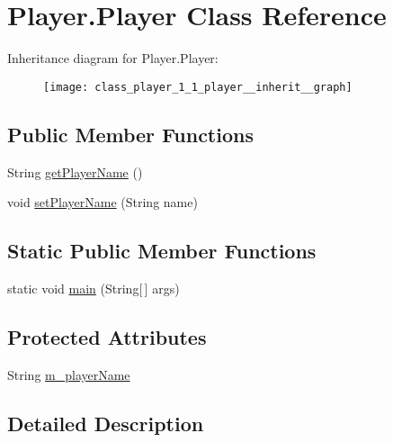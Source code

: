 \hypertarget{class_player_1_1_player}{}\section{Player.\+Player Class Reference}
\label{class_player_1_1_player}


Inheritance diagram for Player.\+Player\+:\nopagebreak
\begin{figure}[H]
\begin{center}
\leavevmode
\texttt{[image: class\_player\_1\_1\_player\_\_inherit\_\_graph]}
\end{center}
\end{figure}
\subsection*{Public Member Functions}
\begin{DoxyCompactItemize}
\item 
String \hyperlink{class_player_1_1_player_ad8906c9e2ffb8388625575c6673e4b0b}{get\+Player\+Name} ()
\item 
void \hyperlink{class_player_1_1_player_ab3aeb1c66c6adb5c9a6581b5ab1707a2}{set\+Player\+Name} (String name)
\end{DoxyCompactItemize}
\subsection*{Static Public Member Functions}
\begin{DoxyCompactItemize}
\item 
static void \hyperlink{class_player_1_1_player_afb83f5bf48e6debe52a1e1bbe3e8fc51}{main} (String\mbox{[}$\,$\mbox{]} args)
\end{DoxyCompactItemize}
\subsection*{Protected Attributes}
\begin{DoxyCompactItemize}
\item 
String \hyperlink{class_player_1_1_player_ae0d0eb69723836aefbfbe50171f025f1}{m\+\_\+player\+Name}
\end{DoxyCompactItemize}


\subsection{Detailed Description}


